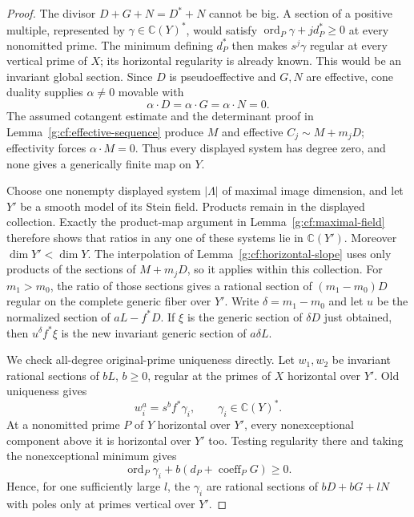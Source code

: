 \begin{proof}
The divisor $D+G+N=D^*+N$ cannot be big. A section of a positive
multiple, represented by $\gamma\in\mathbb C(Y)^*$, would satisfy
$\operatorname{ord}_P\gamma+j d_P^*\geq0$ at every nonomitted prime.
The minimum defining $d_P^*$ then makes $s^j\gamma$ regular at every
vertical prime of $X$; its horizontal regularity is already known.
This would be an invariant global section. Since $D$ is pseudoeffective
and $G,N$ are effective, cone duality supplies $\alpha\ne0$ movable with
\[
 \alpha\cdot D=\alpha\cdot G=\alpha\cdot N=0.
\]
The assumed cotangent estimate and the determinant proof in
Lemma~\ref{g:cf:effective-sequence} produce $M$ and effective
$C_j\sim M+m_jD$; effectivity forces $\alpha\cdot M=0$.
Thus every displayed system has degree zero, and none gives a generically
finite map on $Y$.

Choose one nonempty displayed system $|\Lambda|$ of maximal image
dimension, and let $Y'$ be a smooth model of its Stein field. Products
remain in the displayed collection. Exactly the product-map argument in
Lemma~\ref{g:cf:maximal-field} therefore shows that ratios in any one
of these systems lie in $\mathbb C(Y')$. Moreover $\dim Y'<\dim Y$.
The interpolation of Lemma~\ref{g:cf:horizontal-slope} uses only products
of the sections of $M+m_jD$, so it applies within this collection. For
$m_1>m_0$, the ratio of those sections gives a rational section of
$(m_1-m_0)D$ regular on the complete generic fiber over $Y'$. Write $\delta=m_1-m_0$ and let $u$ be the normalized section of
$aL-f^*D$. If $\xi$ is the generic section of $\delta D$ just obtained,
then $u^\delta f^*\xi$ is the new invariant generic section of
$a\delta L$.

We check all-degree original-prime uniqueness directly. Let $w_1,w_2$
be invariant rational sections of $bL$, $b\geq0$, regular at the primes
of $X$ horizontal over $Y'$. Old uniqueness gives
\[
 w_i^a=s^b f^*\gamma_i,\qquad \gamma_i\in\mathbb C(Y)^*.
\]
At a nonomitted prime $P$ of $Y$ horizontal over $Y'$, every
nonexceptional component above it is horizontal over $Y'$ too. Testing
regularity there and taking the nonexceptional minimum gives
\[
 \operatorname{ord}_P\gamma_i+b(d_P+\operatorname{coeff}_P G)\geq0.
\]
Hence, for one sufficiently large $l$, the $\gamma_i$ are rational
sections of $bD+bG+lN$ with poles only at primes vertical over $Y'$.


\end{proof}

